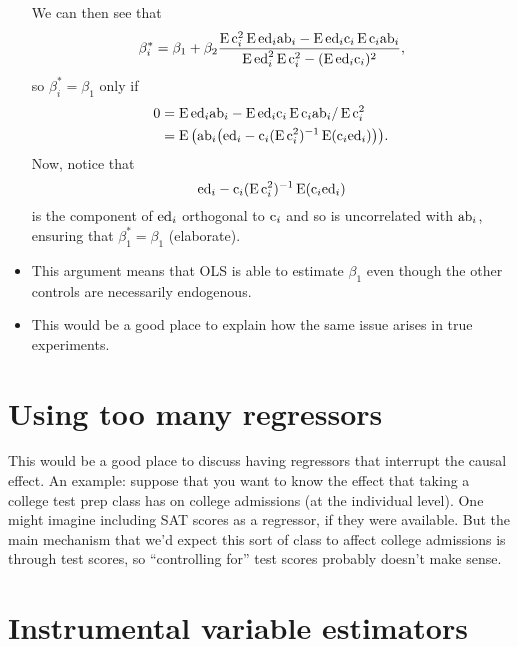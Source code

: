 \begin{itemize}[leftmargin=0pt]
  We can then see that
  \begin{equation*}
    \beta_i^* = \beta_1 + \beta_2 
    \frac{\E \co_i^2 \E \ed_i \ab_i - \E\ed_i \co_i \E \co_i \ab_i}%
    {\E \ed_i^2 \E \co_i^2 - (\E \ed_i \co_i)^2},
  \end{equation*}
  so $\beta_i^* = \beta_1$ only if
  \begin{align*}
    0
    &= \operatorname{E} \text{ed}_i \text{ab}_i - \operatorname{E}\text{ed}_i \text{c}_i \operatorname{E} \text{c}_i \text{ab}_i / \operatorname{E} \text{c}_i^2 \\
    &= \operatorname{E}\big( \text{ab}_i \big(\text{ed}_i - \text{c}_i (\operatorname{E} \text{c}_i^2)^{-1}\operatorname{E}(\text{c}_i
    \text{ed}_i) \big) \big).
  \end{align*}
  Now, notice that
  \begin{equation*}
    \text{ed}_i - \text{c}_i (\operatorname{E} \text{c}_i^2)^{-1}\operatorname{E}(\text{c}_i \text{ed}_i)
  \end{equation*}
  is the component of $\text{ed}_i$ orthogonal to $\text{c}_i$ and so is
  uncorrelated with $\text{ab}_i$, ensuring that $\beta_1^* = \beta_1$
  (elaborate).

\item This argument means that OLS is able to estimate $\beta_1$ even
  though the other controls are necessarily endogenous.

\item This would be a good place to explain how the same issue arises
  in true experiments.

\end{itemize}

\section{Using too many regressors}

This would be a good place to discuss having regressors that interrupt
the causal effect. An example: suppose that you want to know the
effect that taking a college test prep class has on college admissions
(at the individual level). One might imagine including SAT scores as a
regressor, if they were available. But the main mechanism that we'd
expect this sort of class to affect college admissions is through test
scores, so ``controlling for'' test scores probably doesn't make sense.

\section{Instrumental variable estimators}

